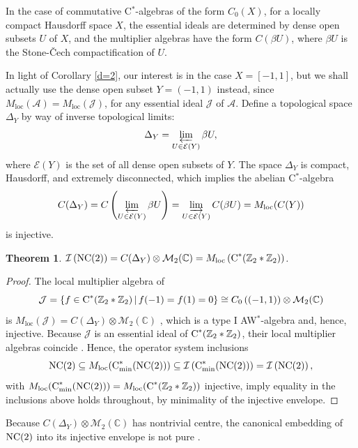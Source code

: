 \documentclass{amsart}
\newtheorem{theorem}{Theorem}[section]
\theoremstyle{definition}
\theoremstyle{remark}
\newcommand{\M}{\mathcal{M}}
\newcommand{\A}{\mathcal{A}}                    %
\newcommand{\jay}{\mathcal{J}}                   %
\newcommand\cstar{{\textrm C}^*}                              %
\newcommand\cstare{{\textrm C}_{\textrm{min}}^*}              %
\numberwithin{equation}{section}
\begin{document}
In the case of commutative C$^*$-algebras of the form $C_0(X)$, for a locally compact Hausdorff space $X$, the essential ideals are determined by dense open subsets $U$ of $X$,
and the multiplier algebras have the form $C(\beta U)$, where $\beta U$ is the Stone-\v Cech compactification of $U$.

In light of Corollary \ref{d=2}, our interest is in the case $X=[-1,1]$, but we shall actually use the dense open subset $Y=(-1,1)$ instead, 
since $M_{\textrm{loc}}(\A)=M_{\textrm{loc}}(\jay)$, for any essential ideal $\jay$ of $\A$.
Define a topological space $\Delta_Y$ by way of inverse topological limits:
\[
\Delta_Y =  \varprojlim_{U\in\mathcal E(Y)}\beta U,
 \]
where $\mathcal E(Y)$ is the set of all dense open subsets of $Y$. The space $\Delta_Y$ is compact, Hausdorff, and
extremely disconnected, which implies the abelian C$^*$-algebra 
\[
C(\Delta_Y)=C\left( \varprojlim_{U\in\mathcal E(Y)}\beta U\right)=\varinjlim _{U\in\mathcal E(Y)}C(\beta U)= M_{\textrm{loc}}(C(Y))
\]
is injective.

\begin{theorem}\label{injective_envelope_d=2} 
$\mathcal I\left( \mbox{\textrm{NC}}(2)\right) = C(\Delta_Y)\otimes\M_2(\mathbb C) = M_{\textrm{loc}}\left(\cstar(\mathbb Z_2 * \mathbb Z_2)\right)$.
\end{theorem}

\begin{proof} The local multiplier algebra of 
\[
\jay=\left\{ f\in\cstar(\mathbb Z_2 * \mathbb Z_2)\,|\,f(-1)=f(1)=0\right\}\cong C_0\left( (-1,1) \right)\otimes\M_2(\mathbb C)
\]
is $M_{\textrm{loc}}(\jay)=C(\Delta_Y)\otimes\M_2(\mathbb C)$ \cite{argerami--farenick--massey2009}, which is a type I AW$^*$-algebra and, hence, injective. 
Because $\jay$ is an essential ideal of $\cstar(\mathbb Z_2 * \mathbb Z_2)$, their local multiplier algebras coincide \cite{pedersen1978}. 
Hence, the operator system inclusions 
\[
\mbox{\textrm{NC}}(2) \subseteq M_{\textrm{loc}}(\cstare(\mbox{\textrm{NC}}(2))) 
\subseteq  \mathcal I\left( \cstare(\mbox{\textrm{NC}}(2))\right)
= \mathcal I\left( \mbox{\textrm{NC}}(2)\right),
\]
with $M_{\textrm{loc}}(\cstare(\mbox{\textrm{NC}}(2)))=
M_{\textrm{loc}}(\cstar(\mathbb Z_2 * \mathbb Z_2))$ injective, imply equality in the inclusions above holds throughout, by minimality of the injective
envelope.
\end{proof}

Because $C(\Delta_Y)\otimes\M_2(\mathbb C)$ has nontrivial centre, the canonical embedding
of $ \mbox{\textrm{NC}}(2)$ into its injective envelope is not pure \cite[Theorem 2.14]{farenick--tessier2022}.
\end{document}
